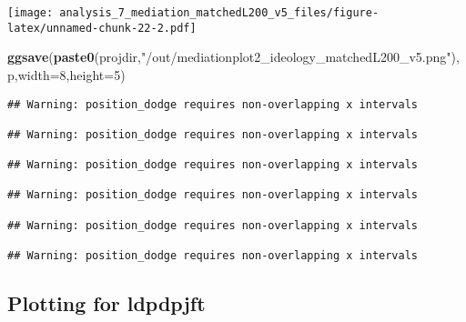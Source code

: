 \documentclass[
]{article}
\newenvironment{Shaded}{\begin{snugshade}}{\end{snugshade}}
\newcommand{\DataTypeTok}[1]{\textcolor[rgb]{0.13,0.29,0.53}{#1}}
\newcommand{\DecValTok}[1]{\textcolor[rgb]{0.00,0.00,0.81}{#1}}
\newcommand{\KeywordTok}[1]{\textcolor[rgb]{0.13,0.29,0.53}{\textbf{#1}}}
\newcommand{\NormalTok}[1]{#1}
\newcommand{\StringTok}[1]{\textcolor[rgb]{0.31,0.60,0.02}{#1}}
\begin{document}
\texttt{[image: analysis\_7\_mediation\_matchedL200\_v5\_files/figure-latex/unnamed-chunk-22-2.pdf]}

\begin{Shaded}
\begin{Highlighting}[]
\KeywordTok{ggsave}\NormalTok{(}\KeywordTok{paste0}\NormalTok{(projdir,}\StringTok{"/out/mediationplot2_ideology_matchedL200_v5.png"}\NormalTok{),p,}\DataTypeTok{width=}\DecValTok{8}\NormalTok{,}\DataTypeTok{height=}\DecValTok{5}\NormalTok{)}
\end{Highlighting}
\end{Shaded}

\begin{verbatim}
## Warning: position_dodge requires non-overlapping x intervals

## Warning: position_dodge requires non-overlapping x intervals

## Warning: position_dodge requires non-overlapping x intervals

## Warning: position_dodge requires non-overlapping x intervals

## Warning: position_dodge requires non-overlapping x intervals

## Warning: position_dodge requires non-overlapping x intervals
\end{verbatim}

\hypertarget{plotting-for-ldpdpjft}{%
\subsection{Plotting for ldpdpjft}\label{plotting-for-ldpdpjft}}
\end{document}
